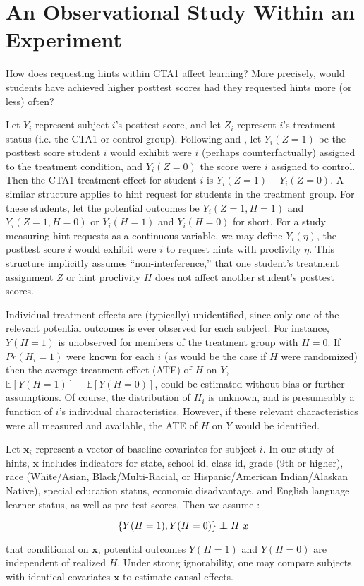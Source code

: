 \documentclass{article}
\newcommand{\EE}{\mathbb{E}}
\newenvironment{ass}[2][Assumption:]{\begin{trivlist}
\item[\hskip \labelsep {\bfseries #1}\hskip \labelsep {\bfseries #2}.]}{\end{trivlist}}
\def\independenT#1#2{\mathrel{\rlap{$#1#2$}\mkern2mu{#1#2}}}
\newcommand\independent{\protect\mathpalette{\protect\independenT}{\perp}}
\begin{document}
\section{An Observational Study Within an Experiment}\label{sec:observational}

How does requesting hints within CTA1 affect learning?
More precisely, would students have achieved higher posttest scores
had they requested hints more (or less) often?

Let $Y_i$ represent subject $i$'s posttest score, and let $Z_i$ represent
$i$'s treatment status (i.e. the CTA1 or control group).
Following \citet{neyman} and \citet{rubin}, let $Y_i(Z=1)$ be
the posttest score student $i$ would exhibit were $i$ (perhaps
counterfactually) assigned to the treatment condition, and
$Y_i(Z=0)$ the score were $i$ assigned to control.
Then the CTA1 treatment effect for student $i$ is $Y_i(Z=1)-Y_i(Z=0)$.
A similar structure applies to hint request for students in the
treatment group.
For these students, let the potential outcomes be $Y_i(Z=1,H=1)$ and
$Y_i(Z=1,H=0)$ or $Y_i(H=1)$ and $Y_i(H=0)$ for short.
For a study measuring hint requests as a continuous variable, we may
define $Y_i(\eta)$, the posttest score $i$ would exhibit were $i$ to
request hints with proclivity $\eta$.
This structure implicitly assumes ``non-interference,'' that one
student's treatment assignment $Z$ or hint proclivity $H$ does not
affect another student's posttest scores.

Individual treatment effects are (typically) unidentified, since only
one of the relevant potential outcomes is ever observed for each
subject.
For instance, $Y(H=1)$ is unobserved for members of the
treatment group with $H=0$.
If $Pr(H_i=1)$ were known for each $i$ (as would be the case if $H$
were randomized) then the average treatment effect (ATE) of $H$ on $Y$,
$\EE[Y(H=1)]-\EE[Y(H=0)]$, could be estimated without bias or further
assumptions.
Of course, the distribution of $H_i$ is unknown, and is presumeably a
function of $i$'s individual characteristics.
However, if these relevant characteristics were all measured and
available, the ATE of $H$ on $Y$ would be identified.

Let $\bm{x}_i$ represent a vector of baseline covariates for subject $i$.
In our study of hints, $\bm{x}$ includes indicators for state, school
id, class id, grade (9th or higher), race (White/Asian,
Black/Multi-Racial, or Hispanic/American Indian/Alaskan Native),
special education status, economic disadvantage, and English language
learner status, as well as pre-test scores.
Then we assume \citep[c.f.][]{rosenbaum1983central}:
\begin{ass}{Strong Ignorability}
\begin{equation*}
 \{Y(H=1),Y(H=0)\}\independent H |\bm{x}
\end{equation*}
\end{ass}
that conditional on $\bm{x}$, potential outcomes $Y(H=1)$ and $Y(H=0)$
are independent of realized $H$.
Under strong ignorability, one may compare subjects with identical
covariates $\bm{x}$ to estimate causal effects.
\end{document}
